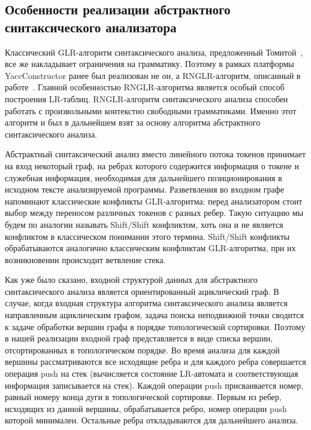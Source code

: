 \subsection{Особенности реализации абстрактного синтаксического анализатора}
Классический GLR-алгоритм синтаксического анализа, предложенный Томитой~\cite{Tomita:1984:LPN:980431.980564, Tomita:1985:ECP:1623611.1623625, Tomita:1985:EPN:537456}, 
все же накладывает ограничения на грамматику. Поэтому в рамках платформы YaccConstructor 
ранее был реализован не он, а RNGLR-алгоритм, описанный в работе~\cite{Scott:2006:RNG:1146809.1146810}. Главной 
особенностью RNGLR-алгоритма является особый способ построения LR-таблиц. 
RNGLR-алгоритм синтаксического анализа способен работать с произвольными контекстно 
свободными грамматиками. Именно этот алгоритм и был в дальнейшем взят за основу 
алгоритма абстрактного синтаксического анализа. 

Абстрактный синтаксический анализ вместо линейного потока токенов принимает на 
вход некоторый граф, на ребрах которого содержится информация о токене и служебная 
информация, необходимая для дальнейшего позиционирования в исходном тексте 
анализируемой программы. Разветвления во входном графе напоминают классические 
конфликты GLR-алгоритма: перед анализатором стоит выбор между переносом различных 
токенов с разных ребер. Такую ситуацию мы будем по аналогии называть Shift/Shift 
конфликтом, хоть она и не является конфликтом в классическом понимании этого термина. 
Shift/Shift конфликты обрабатываются аналогично классическим конфликтам GLR-алгоритма, 
при их возникновении происходит ветвление стека.

Как уже было сказано, входной структурой данных для абстрактного синтаксического 
анализа является ориентированный ациклический граф. В случае, когда входная структура 
алгоритма синтаксического анализа является направленным ациклическим графом, задача 
поиска неподвижной точки сводится к задаче обработки вершин графа в порядке 
топологической сортировки. Поэтому в нашей реализации входной граф представляется 
в виде списка вершин, отсортированных в топологическом порядке. Во время анализа 
для каждой вершины рассматриваются все исходящие ребра и для каждого ребра 
совершается операция push на стек (вычисляется состояние LR-автомата и соответствующая 
информация записывается на стек). Каждой операции push присваивается номер, равный
номеру конца дуги в топологической сортировке. Первым из ребер, исходящих из данной 
вершины, обрабатывается ребро, номер операции push которой минимален. Остальные 
ребра откладываются для дальнейшего анализа. 

